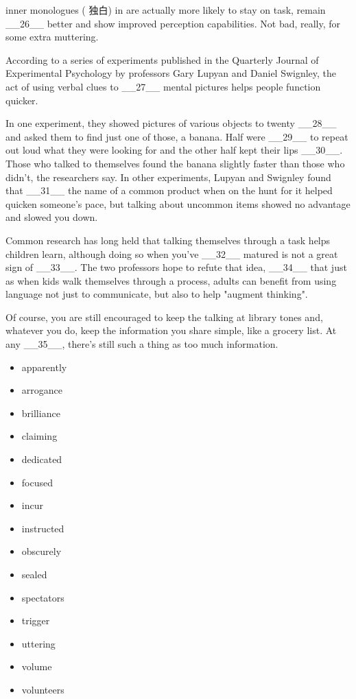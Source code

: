 \documentclass[UTF8,11pt]{ctexart}
\begin{document}
inner monologues ( 独白) in are actually more likely to stay on task, remain \_\_26\_\_ better and show improved perception capabilities. Not bad, really, for some extra muttering.


According to a series of experiments published in the Quarterly Journal of Experimental Psychology by professors Gary Lupyan and Daniel Swignley, the act of using verbal clues to \_\_27\_\_ mental pictures helps people function quicker.


In one experiment, they showed pictures of various objects to twenty \_\_28\_\_ and asked them to find just one of those, a banana. Half were \_\_29\_\_ to repeat out loud what they were looking for and the other half kept their lips \_\_30\_\_. Those who talked to themselves found the banana slightly faster than those who didn't, the researchers say. In other experiments, Lupyan and Swignley found that \_\_31\_\_ the name of a common product when on the hunt for it helped quicken someone's pace, but talking about uncommon items showed no advantage and slowed you down.


Common research has long held that talking themselves through a task helps children learn, although doing so when you've \_\_32\_\_ matured is not a great sign of \_\_33\_\_. The two professors hope to refute that idea, \_\_34\_\_ that just as when kids walk themselves through a process, adults can benefit from using language not just to communicate, but also to help "augment thinking".


Of course, you are still encouraged to keep the talking at library tones and, whatever you do, keep the information you share simple, like a grocery list. At any \_\_35\_\_, there's still such a thing as too much information.


\begin{itemize}[leftmargin=2em,itemsep=.2em,topsep=.4em]\item[A.] apparently
\item[B.] arrogance
\item[C.] brilliance
\item[D.] claiming
\item[E.] dedicated
\item[F.] focused
\item[G.] incur
\item[H.] instructed
\item[I.] obscurely
\item[J.] sealed
\item[K.] spectators
\item[L.] trigger
\item[M.] uttering
\item[N.] volume
\item[O.] volunteers
\end{itemize}
\end{document}
